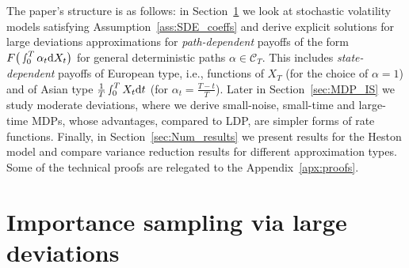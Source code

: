 \documentclass{amsart}[11pt]
\numberwithin{equation}{section}
\numberwithin{theorem}{subsection}
\numberwithin{proposition}{subsection}
\numberwithin{definition}{subsection}
\numberwithin{lemma}{subsection}
\numberwithin{assumption}{subsection}
\newcommand{\Cc}{\mathcal{C}}
\newcommand{\QQ}{\mathbb{Q}}
\newcommand{\EE}{\mathbb{E}}
\newcommand{\Wf}{\boldsymbol{\mathrm{W}}}
\newcommand{\Wp}{W^{\perp}}
\newcommand{\brho}{\overline{\rho}}
\newcommand{\D}{\mathrm{d}}
\newcommand{\E}{\mathrm{e}}
\newcommand{\eps}{\varepsilon}
\newcommand{\hh}{\boldsymbol{\mathrm{h}}}
\begin{document}

The paper's structure is as follows: 
in Section~\ref{sec:LDP_IS} we look at stochastic volatility models satisfying Assumption~\ref{ass:SDE_coeffs} and derive explicit solutions for large deviations approximations for \textit{path-dependent} payoffs of the form $F\big(\smallint _0^T\alpha_t\D X_t\big)$ for general deterministic  paths $\alpha\in\Cc_T$. This includes \textit{state-dependent} payoffs of European type, i.e., functions of $X_T$ (for the choice of $\alpha = 1$) and of Asian type $\frac{1}{T}\smallint_0^TX_t\D t$ (for $\alpha_t = \frac{T-t}{T}$). Later in Section~\ref{sec:MDP_IS} we study moderate deviations, where we derive small-noise, small-time and large-time MDPs, whose advantages, compared to LDP, are simpler forms of rate functions. Finally, in Section~\ref{sec:Num_results} we present results for the Heston model and compare variance reduction results for different approximation types. Some of the technical proofs are relegated to the Appendix~\ref{apx:proofs}.


\section{Importance sampling via large deviations}\label{sec:LDP_IS}

\end{document}
